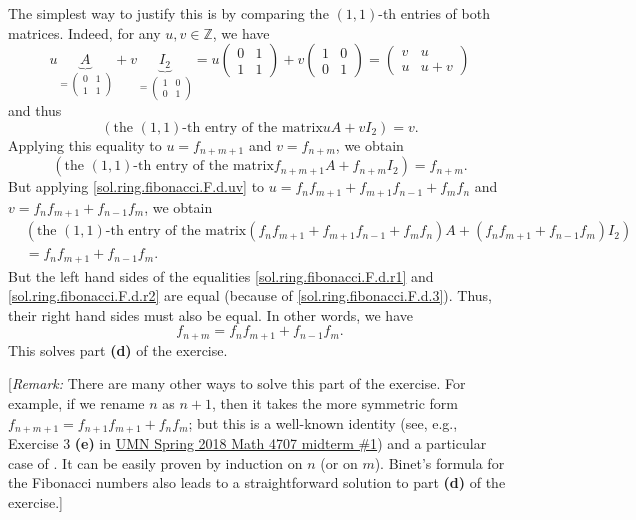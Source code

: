 \documentclass[paper=a4, fontsize=12pt]{scrartcl}%
\theoremstyle{plainsl}
\theoremstyle{definition}
\theoremstyle{remark}
\begin{document}
The simplest way to justify this is by comparing the $\left(  1,1\right)  $-th
entries of both matrices. Indeed, for any $u,v\in\mathbb{Z}$, we have%
\[
u\underbrace{A}_{=%
\begin{pmatrix}
0 & 1\\
1 & 1
\end{pmatrix}
}+v\underbrace{I_{2}}_{=%
\begin{pmatrix}
1 & 0\\
0 & 1
\end{pmatrix}
}=u%
\begin{pmatrix}
0 & 1\\
1 & 1
\end{pmatrix}
+v%
\begin{pmatrix}
1 & 0\\
0 & 1
\end{pmatrix}
=%
\begin{pmatrix}
v & u\\
u & u+v
\end{pmatrix}
\]
and thus%
\begin{equation}
\left(  \text{the }\left(  1,1\right)  \text{-th entry of the matrix
}uA+vI_{2}\right)  =v. \label{sol.ring.fibonacci.F.d.uv}%
\end{equation}
Applying this equality to $u=f_{n+m+1}$ and $v=f_{n+m}$, we obtain%
\begin{equation}
\left(  \text{the }\left(  1,1\right)  \text{-th entry of the matrix
}f_{n+m+1}A+f_{n+m}I_{2}\right)  =f_{n+m}. \label{sol.ring.fibonacci.F.d.r1}%
\end{equation}
But applying \eqref{sol.ring.fibonacci.F.d.uv} to $u=f_{n}f_{m+1}%
+f_{m+1}f_{n-1}+f_{m}f_{n}$ and $v=f_{n}f_{m+1}+f_{n-1}f_{m}$, we obtain%
\begin{align}
&  \left(  \text{the }\left(  1,1\right)  \text{-th entry of the matrix
}\left(  f_{n}f_{m+1}+f_{m+1}f_{n-1}+f_{m}f_{n}\right)  A+\left(  f_{n}%
f_{m+1}+f_{n-1}f_{m}\right)  I_{2}\right) \nonumber\\
&  =f_{n}f_{m+1}+f_{n-1}f_{m}. \label{sol.ring.fibonacci.F.d.r2}%
\end{align}
But the left hand sides of the equalities \eqref{sol.ring.fibonacci.F.d.r1}
and \eqref{sol.ring.fibonacci.F.d.r2} are equal (because of
\eqref{sol.ring.fibonacci.F.d.3}). Thus, their right hand sides must also be
equal. In other words, we have%
\[
f_{n+m}=f_{n}f_{m+1}+f_{n-1}f_{m}.
\]
This solves part \textbf{(d)} of the exercise.

[\textit{Remark:} There are many other ways to solve this part of the
exercise. For example, if we rename $n$ as $n+1$, then it takes the more
symmetric form $f_{n+m+1}=f_{n+1}f_{m+1}+f_{n}f_{m}$; but this is a well-known
identity (see, e.g., Exercise 3 \textbf{(e)} in
\href{http://www.cip.ifi.lmu.de/~grinberg/t/18s/mt1s.pdf}{UMN Spring 2018 Math
4707 midterm \#1}) and a particular case of \cite[Theorem 2.26 \textbf{(a)}%
]{detnotes}. It can be easily proven by induction on $n$ (or on $m$). Binet's
formula for the Fibonacci numbers also leads to a straightforward solution to
part \textbf{(d)} of the exercise.]
\end{document}
